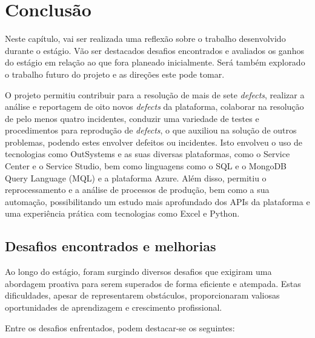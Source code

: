 \section{Conclusão}\label{sec:conclusao}

        Neste capítulo, vai ser realizada uma reflexão sobre o trabalho desenvolvido durante o estágio. Vão ser destacados desafios encontrados e avaliados os ganhos do estágio em relação ao que fora planeado inicialmente. Será também explorado o trabalho futuro do projeto e as direções este pode tomar.

        O projeto permitiu contribuir para a resolução de mais de sete \textit{defects}, realizar a análise e reportagem de oito novos \textit{defects} da plataforma, colaborar na resolução de pelo menos quatro incidentes, conduzir uma variedade de testes e procedimentos para reprodução de \textit{defects}, o que auxiliou na solução de outros problemas, podendo estes envolver defeitos ou incidentes. Isto envolveu o uso de tecnologias como OutSystems e as suas diversas plataformas, como o Service Center e o Service Studio, bem como linguagens como o SQL e o MongoDB Query Language (MQL) e a plataforma Azure. Além disso, permitiu o reprocessamento e a análise de processos de produção, bem como a sua automação, possibilitando um estudo mais aprofundado dos APIs da plataforma e uma experiência prática com tecnologias como Excel e Python.

    \subsection{Desafios encontrados e melhorias}\label{sub:desafios_encontrados}

        Ao longo do estágio, foram surgindo diversos desafios que exigiram uma abordagem proativa para serem superados de forma eficiente e atempada. Estas dificuldades, apesar de representarem obstáculos, proporcionaram valiosas oportunidades de aprendizagem e crescimento profissional.



        Entre os desafios enfrentados, podem destacar-se os 
        seguintes:

